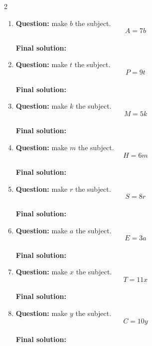 \documentclass[11pt]{article}
\begin{document}
\begin{multicols}{2}
\begin{enumerate}[leftmargin=*, itemsep=10pt]
\item \textbf{Question:} make \( b \) the subject.
\[
A=7b
\] \\[4cm]
\textbf{Final solution:}\\[1.5cm]

\item \textbf{Question:} make \( t \) the subject.
\[
P=9t
\] \\[4cm]
\textbf{Final solution:}\\[1.5cm]

\newpage
\item \textbf{Question:} make \( k \) the subject.
\[
M=5k
\] \\[4cm]
\textbf{Final solution:}\\[1.5cm]

\item \textbf{Question:} make \( m \) the subject.
\[
H=6m
\] \\[4cm]
\textbf{Final solution:}\\[1.5cm]

\item \textbf{Question:} make \( r \) the subject.
\[
S=8r
\] \\[4cm]
\textbf{Final solution:}\\[1.5cm]

\item \textbf{Question:} make \( a \) the subject.
\[
E=3a
\] \\[4cm]
\textbf{Final solution:}\\[1.5cm]

\item \textbf{Question:} make \( x \) the subject.
\[
T=11x
\] \\[4cm]
\textbf{Final solution:}\\[1.5cm]

\item \textbf{Question:} make \( y \) the subject.
\[
C=10y
\] \\[4cm]
\textbf{Final solution:}\\[1.5cm]


\end{enumerate}
\end{multicols}
\end{document}
